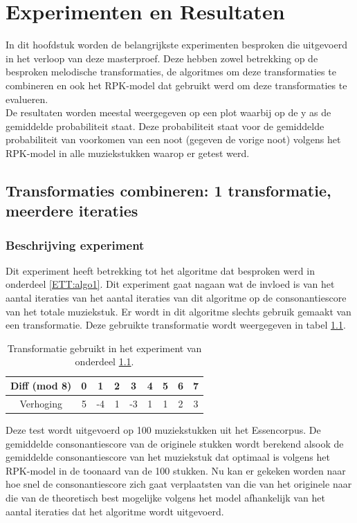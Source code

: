 \chapter{Experimenten en Resultaten}
\label{hoofdstuk:ER}
In dit hoofdstuk worden de belangrijkste experimenten besproken die uitgevoerd in het verloop van deze masterproef. Deze hebben zowel betrekking op de besproken melodische transformaties, de algoritmes om deze transformaties te combineren en ook het RPK-model dat gebruikt werd om deze transformaties te evalueren.\\
De resultaten worden meestal weergegeven op een plot waarbij op de y as de gemiddelde probabiliteit staat. Deze probabiliteit staat voor de gemiddelde probabiliteit van voorkomen van een noot (gegeven de vorige noot) volgens het RPK-model in alle muziekstukken waarop er getest werd.

\section{Transformaties combineren: 1 transformatie, meerdere iteraties}
\label{experiment:1}
\subsection{Beschrijving experiment}
Dit experiment heeft betrekking tot het algoritme dat besproken werd in onderdeel \ref{ETT:algo1}. Dit experiment gaat nagaan wat de invloed is van het aantal iteraties van het aantal iteraties van dit algoritme op de consonantiescore van het totale muziekstuk. Er wordt in dit algoritme slechts gebruik gemaakt van een transformatie. Deze gebruikte transformatie wordt weergegeven in tabel \ref{tabel:exp1}.

\begin{table}
  \centering
  \begin{tabular}{c | c c c c c c c c }
    Diff (mod 8) & 0 & 1 & 2 & 3 & 4 & 5 & 6 & 7 \\
    \hline
    \hline
    Verhoging & 5 & -4 & 1 & -3 & 1 & 1 & 2 & 3 \\
  \end{tabular}
  \caption{Transformatie gebruikt in het experiment van onderdeel \ref{experiment:1}.}
  \label{tabel:exp1}
\end{table}

Deze test wordt uitgevoerd op 100 muziekstukken uit het Essencorpus. De gemiddelde consonantiescore van de originele stukken wordt berekend alsook de gemiddelde consonantiescore van het muziekstuk dat optimaal is volgens het RPK-model in de toonaard van de 100 stukken. Nu kan er gekeken worden naar hoe snel de consonantiescore zich gaat verplaatsten van die van het originele naar die van de theoretisch best mogelijke volgens het model afhankelijk van het aantal iteraties dat het algoritme wordt uitgevoerd.

